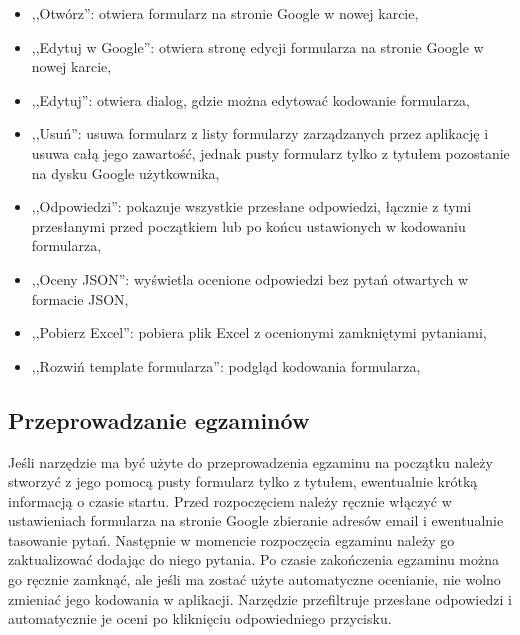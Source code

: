 \begin{itemize}
  \item ,,Otwórz'': otwiera formularz na stronie Google w nowej karcie,
  \item ,,Edytuj w Google'': otwiera stronę edycji formularza na stronie Google
    w nowej karcie,
  \item ,,Edytuj'': otwiera dialog, gdzie można edytować kodowanie formularza,
  \item ,,Usuń'': usuwa formularz z listy formularzy zarządzanych przez aplikację
    i usuwa całą jego zawartość, jednak pusty formularz tylko z tytułem pozostanie 
    na dysku Google użytkownika,
  \item ,,Odpowiedzi'': pokazuje wszystkie przesłane odpowiedzi, łącznie z tymi
    przesłanymi przed początkiem lub po końcu ustawionych w kodowaniu formularza,
  \item ,,Oceny JSON'': wyświetla ocenione odpowiedzi bez pytań otwartych w formacie
    JSON,
  \item ,,Pobierz Excel'': pobiera plik Excel z ocenionymi zamkniętymi pytaniami,
  \item ,,Rozwiń template formularza'': podgląd kodowania formularza,
\end{itemize}

\subsection{Przeprowadzanie egzaminów}
Jeśli narzędzie ma być użyte do przeprowadzenia egzaminu na początku należy stworzyć
z jego pomocą pusty formularz tylko z tytułem, ewentualnie krótką informacją o czasie
startu. Przed rozpoczęciem należy ręcznie włączyć w ustawieniach formularza na stronie
Google zbieranie adresów email i ewentualnie tasowanie pytań. Następnie w momencie
rozpoczęcia egzaminu należy go zaktualizować dodając do niego pytania.
Po czasie zakończenia egzaminu można go ręcznie zamknąć, ale jeśli ma zostać użyte
automatyczne ocenianie, nie wolno zmieniać jego kodowania w aplikacji. Narzędzie
przefiltruje przesłane odpowiedzi i automatycznie je oceni po kliknięciu
odpowiedniego przycisku.

